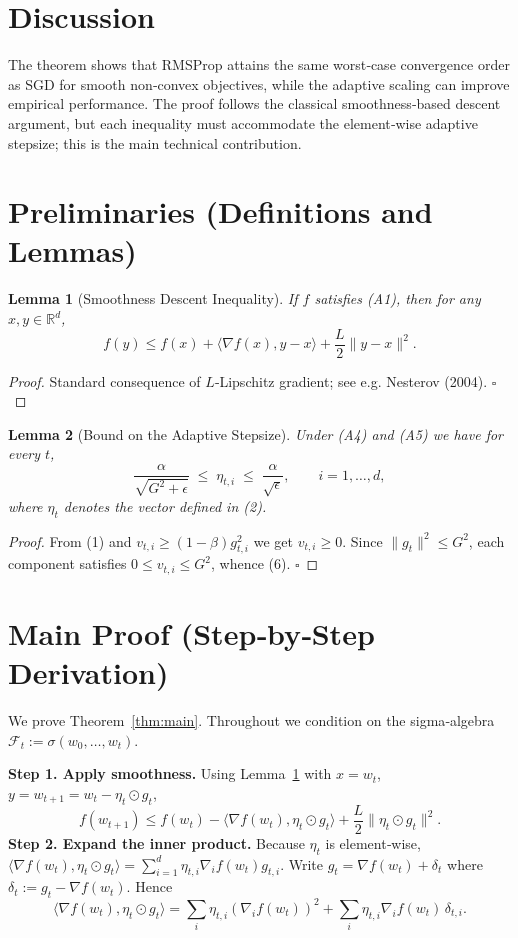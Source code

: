 \documentclass{article}
\newtheorem{lemma}{Lemma}
\newcommand{\R}{\mathbb{R}}
\begin{document}
\section*{Discussion}
The theorem shows that RMSProp attains the same worst‑case convergence order as SGD for smooth non‑convex objectives, while the adaptive scaling can improve empirical performance. The proof follows the classical smoothness‑based descent argument, but each inequality must accommodate the element‑wise adaptive stepsize; this is the main technical contribution.

\newpage
\section*{Preliminaries (Definitions and Lemmas)}
\begin{lemma}[Smoothness Descent Inequality]
\label{lem:smooth}
If $f$ satisfies (A1), then for any $x,y\in\R^{d}$,
\[
f(y) \le f(x) + \langle\nabla f(x),y-x\rangle + \frac{L}{2}\|y-x\|^{2}.
\tag{5}
\]
\end{lemma}
\begin{proof}
Standard consequence of $L$‑Lipschitz gradient; see e.g. Nesterov (2004). \hfill $\square$
\end{proof}

\begin{lemma}[Bound on the Adaptive Stepsize]
\label{lem:stepsize}
Under (A4) and (A5) we have for every $t$,
\[
\frac{\alpha}{\sqrt{G^{2}+\epsilon}} \;\le\; \eta_{t,i} \;\le\; \frac{\alpha}{\sqrt{\epsilon}},
\qquad i=1,\dots,d,
\tag{6}
\]
where $\eta_t$ denotes the vector defined in (2).
\end{lemma}
\begin{proof}
From (1) and $v_{t,i}\ge (1-\beta)g_{t,i}^{2}$ we get $v_{t,i}\ge 0$.
Since $\|g_t\|^{2}\le G^{2}$, each component satisfies $0\le v_{t,i}\le G^{2}$, whence (6). \hfill $\square$
\end{proof}

\section*{Main Proof (Step‑by‑Step Derivation)}
We prove Theorem~\ref{thm:main}. Throughout we condition on the sigma‑algebra $\mathcal{F}_t:=\sigma(w_0,\dots,w_t)$.

\noindent\textbf{Step 1. Apply smoothness.}  
Using Lemma~\ref{lem:smooth} with $x=w_t$, $y=w_{t+1}=w_t-\eta_t\odot g_t$,
\[
f(w_{t+1})\le f(w_t)-\langle\nabla f(w_t),\eta_t\odot g_t\rangle
+\frac{L}{2}\|\eta_t\odot g_t\|^{2}.
\tag{7}
\]
\noindent\textbf{Step 2. Expand the inner product.}  
Because $\eta_t$ is element‑wise, $\langle\nabla f(w_t),\eta_t\odot g_t\rangle
= \sum_{i=1}^{d}\eta_{t,i}\nabla_i f(w_t) g_{t,i}$.
Write $g_t = \nabla f(w_t) + \delta_t$ where $\delta_t:=g_t-\nabla f(w_t)$.
Hence
\[
\langle\nabla f(w_t),\eta_t\odot g_t\rangle
= \sum_{i}\eta_{t,i}(\nabla_i f(w_t))^{2}
+ \sum_{i}\eta_{t,i}\nabla_i f(w_t)\,\delta_{t,i}.
\tag{8}
\]
\end{document}
